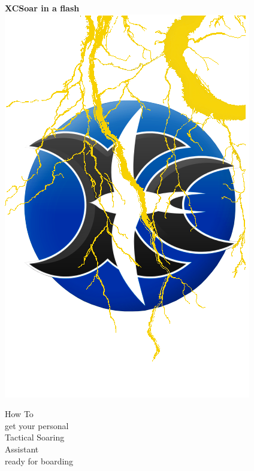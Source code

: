 \documentclass[english,a4paper,12pt]{refrep}
\begin{document}
%
%
%
\thispagestyle{empty}
\begin{center}
\fontsize{34}{0}
\selectfont\textbf{XCSoar in a flash}
\fontsize{12}{12}
\vspace{0.1em}
\includegraphics[angle=0,width=0.58\linewidth,keepaspectratio='true']{figures/blitzlogo.png}

\vspace{1em}
{\Huge How To\\}
\vspace{0.2em}
{\tiny get your personal\\}
{\Huge Tactical Soaring\\ Assistant\\}
\vspace{0.2em}
{\tiny ready for boarding}
\end{center}
\end{document}
